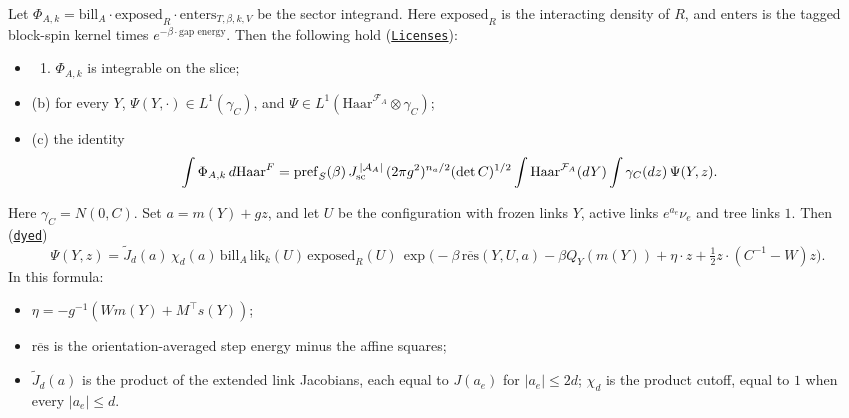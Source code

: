 \documentclass[
  letterpaper,
  11pt]{article}
\providecommand{\tightlist}{%
  \setlength{\itemsep}{0pt}\setlength{\parskip}{0pt}}
\begin{document}
Let
\(\Phi_{A,k}=\mathrm{bill}_A\cdot\mathrm{exposed}_R\cdot\mathrm{enters}_{T,\beta,k,V}\)
be the sector integrand. Here \(\mathrm{exposed}_R\) is the interacting
density of \(R\), and \(\mathrm{enters}\) is the tagged block-spin
kernel times \(e^{-\beta\cdot\text{gap energy}}\). Then the following
hold
(\href{https://github.com/yang-mills-group/OpenAI-YM-20261028/blob/3456e5e75cf8d4cd558955a5c7638fba2d68f464/YM/SectorNext/GAUSSIAN_SECTOR_CHANGE/Change.lean\#L127-L135}{\texttt{Licenses}}):

\begin{itemize}
\tightlist
\item
  \begin{enumerate}
  \def\labelenumi{(\alph{enumi})}
  \tightlist
  \item
    \(\Phi_{A,k}\) is integrable on the slice;
  \end{enumerate}
\item
  (b) for every \(Y\), \(\Psi(Y,\cdot)\in L^1(\gamma_C)\), and
  \(\Psi\in L^1(\mathrm{Haar}^{\mathcal F_A}\otimes\gamma_C)\);
\item
  (c) the identity
  \[\int\Phi_{A,k}\,d\mathrm{Haar}^{F}=\mathrm{pref}_S(\beta)\,J_{\rm sc}^{\,\lvert\mathcal A_A\rvert}\,(2\pi g^2)^{n_a/2}(\det C)^{1/2}\int\mathrm{Haar}^{\mathcal F_A}(dY)\int\gamma_C(dz)\,\Psi(Y,z).\]
\end{itemize}

Here \(\gamma_C=N(0,C)\). Set \(a=m(Y)+gz\), and let \(U\) be the
configuration with frozen links \(Y\), active links \(e^{a_e}\nu_e\) and
tree links \(1\). Then
(\href{https://github.com/yang-mills-group/OpenAI-YM-20261028/blob/3456e5e75cf8d4cd558955a5c7638fba2d68f464/YM/SectorNext/GAUSSIAN_SECTOR_CHANGE/Change.lean\#L63-L71}{\texttt{dyed}})
\[\Psi(Y,z)=\tilde J_d(a)\,\chi_d(a)\,\mathrm{bill}_A\,\mathrm{lik}_k(U)\,\mathrm{exposed}_R(U)\,\exp\!\Big(-\beta\,\overline{\mathrm{res}}(Y,U,a)-\beta Q_Y(m(Y))+\eta\cdot z+\tfrac12 z\cdot(C^{-1}-W)z\Big).\]
In this formula:

\begin{itemize}
\tightlist
\item
  \(\eta=-g^{-1}(Wm(Y)+M^{\top}s(Y))\);
\item
  \(\overline{\mathrm{res}}\) is the orientation-averaged step energy
  minus the affine squares;
\item
  \(\tilde J_d(a)\) is the product of the extended link Jacobians, each
  equal to \(J(a_e)\) for \(\lvert a_e\rvert\le 2d\); \(\chi_d\) is the
  product cutoff, equal to \(1\) when every \(\lvert a_e\rvert\le d\).
\end{itemize}
\end{document}
